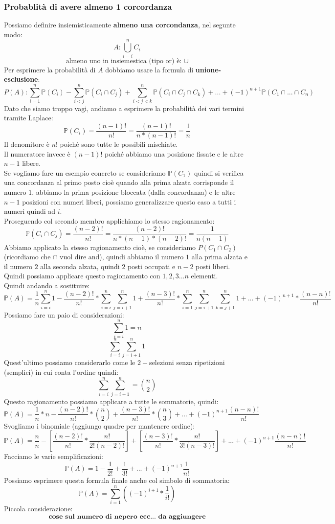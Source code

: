 \subsubsection{Probablità di avere almeno 1 corcordanza}
Possiamo definire insiemisticamente \textbf{almeno una corcondanza}, nel segunte modo: 
$$ A: \bigcup_{i=i}^n C_i$$
$$ \text{almeno uno in insiemestica (tipo or) è: } \cup $$
Per esprimere la probabilità di $A$ dobbiamo usare la formula di \textbf{unione-esclusione}:
$$ P(A): \sum_{i=1}^n \mathbb{P}(C_i) - \sum_{i<j}^n \mathbb{P}(C_i \cap C_j) + \sum_{i<j<k}^n \mathbb{P}(C_i \cap C_j \cap C_k) + ... + (-1)^{n+1} \mathbb{P} (C_1 \cap ... \cap C_n) $$
Dato che siamo troppo vagi, andiamo a esprimere la probabilità dei vari termini tramite Laplace:
$$ \mathbb{P}(C_i) = \frac{(n-1)!}{n!} = \frac{(n-1)!}{n*(n-1)!} = \frac{1}{n} $$
Il denomitore è $n!$ poiché sono tutte le possibili mischiate.\\
Il numeratore invece è $(n-1)!$ poiché abbiamo una posizione fissate e le altre $n-1$ libere.\\
Se vogliamo fare un esempio concreto se consideriamo $\mathbb{P}(C_1)$ quindi si verifica una concordanza al primo posto cioè quando alla prima alzata corrisponde il numero $1$, abbiamo la prima posizione bloccata (dalla concordanza) e le altre $n-1$ posizioni con numeri liberi, possiamo generalizzare questo caso a tutti i numeri quindi ad $i$.\\
Proseguendo col secondo membro applichiamo lo stesso ragionamento:
$$ \mathbb{P}(C_i \cap C_j) = \frac{(n-2)!}{n!} = \frac{(n-2)!}{n*(n-1)*(n-2)!} = \frac{1}{n(n-1)}  $$
Abbiamo applicato la stesso ragionamento cioè, se consideriamo $ P(C_1 \cap C_2)$ (ricordiamo che $\cap$ vuol dire and), quindi abbiamo il numero $1$ alla prima alzata e il numero $2$ alla seconda alzata, quindi $2$ posti occupati e $n-2$ posti liberi.\\
Quindi possiamo applicare questo ragionamento con $1,2,3...n$ elementi.\\
Quindi andando a sostituire:
$$ \mathbb{P}(A) = \frac{1}{n} \sum_{i=i}^n 1 - \frac{(n-2)!}{n!} * \sum_{i=i}^n \sum_{j=i+1}^n 1 + \frac{(n-3)!}{n!} * \sum_{i=1}^n \sum_{j=i+1}^n \sum_{k=j+1}^n 1 + ... + (-1)^{n+1} * \frac{(n-n)!}{n!} $$
Possiamo fare un paio di considerazioni:
$$ \sum_{i=i}^n 1 = n $$
$$ \sum_{i=i}^n \sum_{j=i+1}^n 1 $$
Quest'ultimo possiamo considerarlo come le $2-$selezioni senza ripetizioni (semplici) in cui conta l'ordine quindi:
$$ \sum_{i=i}^n \sum_{j=i+1}^n = \binom{n}{2} $$
Questo ragionamento possiamo applicare a tutte le sommatorie, quindi:
$$ \mathbb{P}(A) = \frac{1}{n} * n - \frac{(n-2)!}{n!} * \binom{n}{2} + \frac{(n-3)!}{n!} * \binom{n}{3} + ... + (-1)^{n+1} \frac{(n-n)!}{n!} $$
Svogliamo i binomiale (aggiungo quadre per mantenere ordine):
$$ \mathbb{P}(A) = \frac{n}{n} - [ \frac{(n-2)!}{n!} * \frac{n!}{2!(n-2)!} ] +  [ \frac{(n-3)!}{n!} * \frac{n!}{3! (n-3)!} ] + ... + (-1)^{n+1} \frac{(n-n)!}{n!} $$
Facciamo le varie semplificazioni:
$$ \mathbb{P}(A) = 1 - \frac{1}{2!} + \frac{1}{3!} + ... + (-1)^{n+1} \frac{1}{n!} $$
Possiamo esprimere questa formula finale anche col simbolo di sommatoria:
$$ \mathbb{P}(A) = \sum_{i=1}^n ((-1)^{i+1} * \frac{1}{i!}) $$
Piccola considerazione:
$$ \textbf{cose sul numero di nepero ecc... da aggiungere} $$
